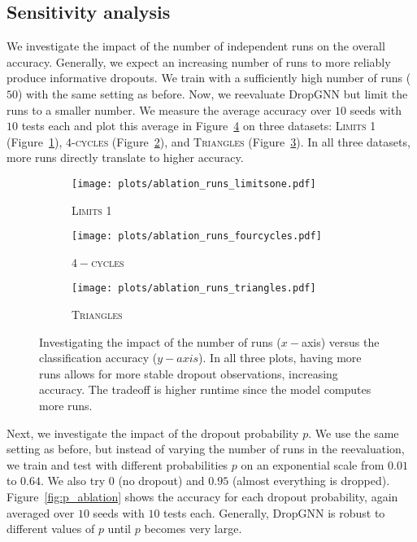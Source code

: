 \documentclass{article}
\begin{document}
\subsection{Sensitivity analysis}
We investigate the impact of the number of independent runs on the overall accuracy. Generally, we expect an increasing number of runs to more reliably produce informative dropouts. We train with a sufficiently high number of runs ($50$) with the same setting as before. Now, we reevaluate DropGNN but limit the runs to a smaller number. We measure the average accuracy over $10$ seeds with $10$ tests each and plot this average in Figure~\ref{fig:run_ablation} on three datasets: \textsc{Limits 1} (Figure~\ref{fig:run_ablation_limitsone}), \textsc{$4$-cycles} (Figure~\ref{fig:run_ablation_4cycles}), and \textsc{Triangles} (Figure~\ref{fig:run_ablation_triangles}). In all three datasets, more runs directly translate to higher accuracy.

\begin{figure}
\begin{subfigure}{0.3\textwidth}
    \centering
    \texttt{[image: plots/ablation\_runs\_limitsone.pdf]}
    \caption{\textsc{Limits 1}}
    \label{fig:run_ablation_limitsone}
\end{subfigure}\hfill
\begin{subfigure}{0.3\textwidth}
    \centering
    \texttt{[image: plots/ablation\_runs\_fourcycles.pdf]}
    \caption{\textsc{$4-$cycles}}
    \label{fig:run_ablation_4cycles}
\end{subfigure}\hfill
\begin{subfigure}{0.3\textwidth}
    \centering
    \texttt{[image: plots/ablation\_runs\_triangles.pdf]}
    \caption{\textsc{Triangles}}
    \label{fig:run_ablation_triangles}
\end{subfigure}
    \caption{Investigating the impact of the number of runs ($x-$axis) versus the classification accuracy ($y-axis$). In all three plots, having more runs allows for more stable dropout observations, increasing accuracy. The tradeoff is higher runtime since the model computes more runs.}
    \label{fig:run_ablation}
\end{figure}

Next, we investigate the impact of the dropout probability $p$. We use the same setting as before, but instead of varying the number of runs in the reevaluation, we train and test with different probabilities $p$ on an exponential scale from $0.01$ to $0.64$. We also try $0$ (no dropout) and $0.95$ (almost everything is dropped). Figure~\ref{fig:p_ablation} shows the accuracy for each dropout probability, again averaged over $10$ seeds with $10$ tests each. Generally, DropGNN is robust to different values of $p$ until $p$ becomes very large.
\end{document}

